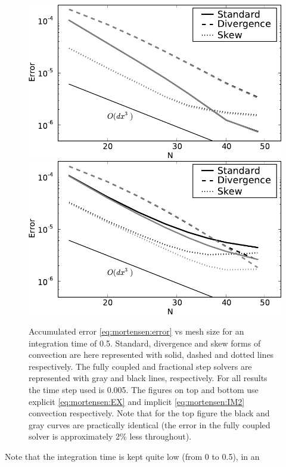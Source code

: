 \begin{figure}
  \centering
  \includegraphics[width=\twofigs]{chapters/mortensen/pdf/OS_init_dx_1.pdf}
  \includegraphics[width=\twofigs]{chapters/mortensen/pdf/OS_init_dx_0.pdf}
%
 \caption{Accumulated error \eqref{eq:mortensen:error} vs mesh size
   for an integration time of 0.5. Standard, divergence and skew forms
   of convection are here represented with solid, dashed and dotted
   lines respectively. The fully coupled and fractional step solvers
   are represented with gray and black lines, respectively. For all
   results the time step used is 0.005. The figures on top and bottom
   use explicit \eqref{eq:mortensen:EX} and implicit \eqref{eq:mortensen:IM2}
   convection respectively. Note that for the top figure the black and
   gray curves are practically identical (the error in the fully
   coupled solver is approximately 2\% less throughout). }
\label{fig:mortensen:OS_init_dx}
\end{figure}
Note that the integration time is kept quite low (from 0 to 0.5), in an
